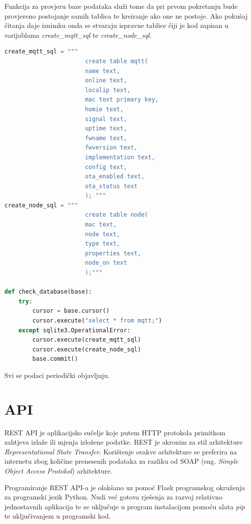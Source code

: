 \documentclass[times, utf8, zavrsni]{fer}
\begin{document}
Funkcija za provjeru baze podataka služi tome da pri prvom pokretanju bude provjereno postojanje samih tablica te kreiranje ako one ne postoje.
Ako pokušaj čitanja daje iznimku onda se stvaraju ispravne tablice čiji je kod zapisan u varijablama \textit{create\_mqtt\_sql} te \textit{create\_node\_sql}.
\begin{lstlisting}[language=Python, caption=Funkcija za provjeru baze podataka]
create_mqtt_sql = """
                       create table mqtt(
                       name text,
                       online text,
                       localip text,
                       mac text primary key,
                       homie text,
                       signal text,
                       uptime text,
                       fwname text,
                       fwversion text,
                       implementation text,
                       config text,
                       ota_enabled text,
                       ota_status text
                       ); """
create_node_sql = """
                       create table node(
                       mac text,
                       node text,
                       type text,
                       properties text,
                       node_on text
                       );"""

def check_database(base):
    try:
        cursor = base.cursor()
        cursor.execute("select * from mqtt;")
    except sqlite3.OperationalError:
        cursor.execute(create_mqtt_sql)
        cursor.execute(create_node_sql)
        base.commit()
\end{lstlisting}

Svi se podaci periodički objavljuju.

\section{API}
REST API je aplikacijsko sučelje koje putem HTTP protokola primitkom zahtjeva izlaže ili mjenja izložene podatke.
REST je akronim za stil arhitekture \textit{Representational State Transfer}.
Korištenje ovakve arhitekture se preferira na internetu zbog količine prenesenih podataka za razliku od SOAP (eng. \textit{Simple Object Access Protokol}) arhitekture.

Programiranje REST API-a je olakšano uz pomoć Flask programskog okruženja za programski jezik Python.
Nudi već gotova rješenja za razvoj relativno jednostavnih aplikacija te se uključuje u program instalacijom pomoću alata \textit{pip} te uključivanjem u programski kod.
\end{document}
